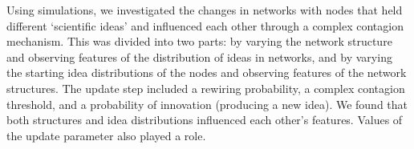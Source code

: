 

Using simulations, we investigated the changes in networks with nodes that held different `scientific ideas' and influenced each other through a complex contagion mechanism. This was divided into two parts: by varying the network structure and observing features of the distribution of ideas in networks, and by varying the starting idea distributions of the nodes and observing features of the network structures. The update step included a rewiring probability, a complex contagion threshold, and a probability of innovation (producing a new idea). We found that both structures and idea distributions influenced each other's features. Values of the update parameter also played a role.